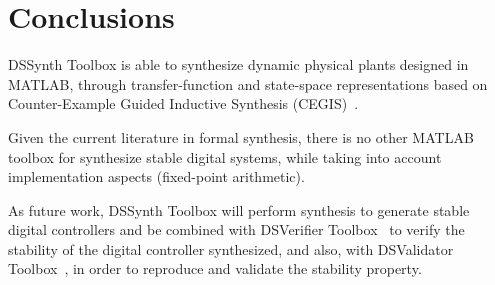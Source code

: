 \documentclass[sigconf]{acmart}
\newcommand\tool{{DSSynth Toolbox}\xspace}
\begin{document}
\section{Conclusions}

\tool is able to synthesize dynamic physical plants designed in MATLAB, through transfer-function and state-space representations based on Counter-Example Guided Inductive Synthesis (CEGIS)~\cite{DBLP:conf/asplos/Solar-LezamaTBSS06}.

Given the current literature in formal synthesis, there is no other MATLAB toolbox for synthesize stable digital systems, while taking into account implementation aspects (fixed-point arithmetic). 

As future work, \tool will perform synthesis to generate stable digital controllers and be combined with DSVerifier Toolbox~\cite{issta2017} to verify the stability of the digital controller synthesized, and also, with DSValidator Toolbox~\cite{dsvalidator}, in order to reproduce and validate the stability property.  



 
\end{document}
